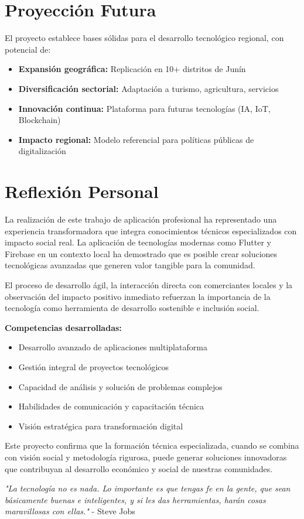 \documentclass[12pt,a4paper]{report}
\begin{document}
\section{Proyección Futura}

El proyecto establece bases sólidas para el desarrollo tecnológico regional, con potencial de:

\begin{itemize}
	\item \textbf{Expansión geográfica:} Replicación en 10+ distritos de Junín
	\item \textbf{Diversificación sectorial:} Adaptación a turismo, agricultura, servicios
	\item \textbf{Innovación continua:} Plataforma para futuras tecnologías (IA, IoT, Blockchain)
	\item \textbf{Impacto regional:} Modelo referencial para políticas públicas de digitalización
\end{itemize}

\section{Reflexión Personal}

La realización de este trabajo de aplicación profesional ha representado una experiencia transformadora que integra conocimientos técnicos especializados con impacto social real. La aplicación de tecnologías modernas como Flutter y Firebase en un contexto local ha demostrado que es posible crear soluciones tecnológicas avanzadas que generen valor tangible para la comunidad.

El proceso de desarrollo ágil, la interacción directa con comerciantes locales y la observación del impacto positivo inmediato refuerzan la importancia de la tecnología como herramienta de desarrollo sostenible e inclusión social.

\textbf{Competencias desarrolladas:}
\begin{itemize}
	\item Desarrollo avanzado de aplicaciones multiplataforma
	\item Gestión integral de proyectos tecnológicos
	\item Capacidad de análisis y solución de problemas complejos
	\item Habilidades de comunicación y capacitación técnica
	\item Visión estratégica para transformación digital
\end{itemize}

Este proyecto confirma que la formación técnica especializada, cuando se combina con visión social y metodología rigurosa, puede generar soluciones innovadoras que contribuyan al desarrollo económico y social de nuestras comunidades.

\vspace{1cm}
\begin{center}
	\textit{"La tecnología no es nada. Lo importante es que tengas fe en la gente, que sean básicamente buenas e inteligentes, y si les das herramientas, harán cosas maravillosas con ellas."} - Steve Jobs
\end{center}
\end{document}
